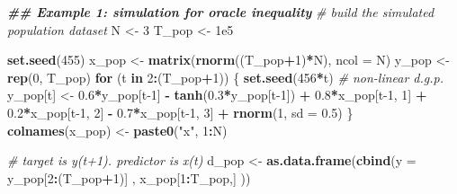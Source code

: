 \documentclass[
]{book}
\newenvironment{Shaded}{\begin{snugshade}}{\end{snugshade}}
\newcommand{\AttributeTok}[1]{\textcolor[rgb]{0.13,0.29,0.53}{#1}}
\newcommand{\CommentTok}[1]{\textcolor[rgb]{0.56,0.35,0.01}{\textit{#1}}}
\newcommand{\ControlFlowTok}[1]{\textcolor[rgb]{0.13,0.29,0.53}{\textbf{#1}}}
\newcommand{\DecValTok}[1]{\textcolor[rgb]{0.00,0.00,0.81}{#1}}
\newcommand{\DocumentationTok}[1]{\textcolor[rgb]{0.56,0.35,0.01}{\textbf{\textit{#1}}}}
\newcommand{\FloatTok}[1]{\textcolor[rgb]{0.00,0.00,0.81}{#1}}
\newcommand{\FunctionTok}[1]{\textcolor[rgb]{0.13,0.29,0.53}{\textbf{#1}}}
\newcommand{\NormalTok}[1]{#1}
\newcommand{\OtherTok}[1]{\textcolor[rgb]{0.56,0.35,0.01}{#1}}
\newcommand{\SpecialCharTok}[1]{\textcolor[rgb]{0.81,0.36,0.00}{\textbf{#1}}}
\newcommand{\StringTok}[1]{\textcolor[rgb]{0.31,0.60,0.02}{#1}}
\begin{document}
\begin{Shaded}
\begin{Highlighting}[]
\DocumentationTok{\#\# Example 1: simulation for oracle inequality}
\CommentTok{\# build the simulated population dataset}
\NormalTok{N }\OtherTok{\textless{}{-}} \DecValTok{3}
\NormalTok{T\_pop }\OtherTok{\textless{}{-}} \FloatTok{1e5}

\FunctionTok{set.seed}\NormalTok{(}\DecValTok{455}\NormalTok{)}
\NormalTok{x\_pop }\OtherTok{\textless{}{-}} \FunctionTok{matrix}\NormalTok{(}\FunctionTok{rnorm}\NormalTok{((T\_pop}\SpecialCharTok{+}\DecValTok{1}\NormalTok{)}\SpecialCharTok{*}\NormalTok{N), }\AttributeTok{ncol =}\NormalTok{ N)}
\NormalTok{y\_pop }\OtherTok{\textless{}{-}} \FunctionTok{rep}\NormalTok{(}\DecValTok{0}\NormalTok{, T\_pop)}
\ControlFlowTok{for}\NormalTok{ (t }\ControlFlowTok{in} \DecValTok{2}\SpecialCharTok{:}\NormalTok{(T\_pop}\SpecialCharTok{+}\DecValTok{1}\NormalTok{)) \{}
  \FunctionTok{set.seed}\NormalTok{(}\DecValTok{456}\SpecialCharTok{*}\NormalTok{t)}
  \CommentTok{\# non{-}linear d.g.p.}
\NormalTok{  y\_pop[t] }\OtherTok{\textless{}{-}} \FloatTok{0.6}\SpecialCharTok{*}\NormalTok{y\_pop[t}\DecValTok{{-}1}\NormalTok{] }\SpecialCharTok{{-}} \FunctionTok{tanh}\NormalTok{(}\FloatTok{0.3}\SpecialCharTok{*}\NormalTok{y\_pop[t}\DecValTok{{-}1}\NormalTok{]) }\SpecialCharTok{+} 
              \FloatTok{0.8}\SpecialCharTok{*}\NormalTok{x\_pop[t}\DecValTok{{-}1}\NormalTok{, }\DecValTok{1}\NormalTok{] }\SpecialCharTok{+} \FloatTok{0.2}\SpecialCharTok{*}\NormalTok{x\_pop[t}\DecValTok{{-}1}\NormalTok{, }\DecValTok{2}\NormalTok{] }\SpecialCharTok{{-}}
              \FloatTok{0.7}\SpecialCharTok{*}\NormalTok{x\_pop[t}\DecValTok{{-}1}\NormalTok{, }\DecValTok{3}\NormalTok{] }\SpecialCharTok{+} \FunctionTok{rnorm}\NormalTok{(}\DecValTok{1}\NormalTok{, }\AttributeTok{sd =} \FloatTok{0.5}\NormalTok{)}
\NormalTok{\}}
\FunctionTok{colnames}\NormalTok{(x\_pop) }\OtherTok{\textless{}{-}} \FunctionTok{paste0}\NormalTok{(}\StringTok{"x"}\NormalTok{, }\DecValTok{1}\SpecialCharTok{:}\NormalTok{N)}

\CommentTok{\# target is y(t+1). predictor is x(t)}
\NormalTok{d\_pop }\OtherTok{\textless{}{-}} \FunctionTok{as.data.frame}\NormalTok{(}\FunctionTok{cbind}\NormalTok{(}\AttributeTok{y =}\NormalTok{ y\_pop[}\DecValTok{2}\SpecialCharTok{:}\NormalTok{(T\_pop}\SpecialCharTok{+}\DecValTok{1}\NormalTok{)] , x\_pop[}\DecValTok{1}\SpecialCharTok{:}\NormalTok{T\_pop,] ))}
\end{Highlighting}
\end{Shaded}
\end{document}
